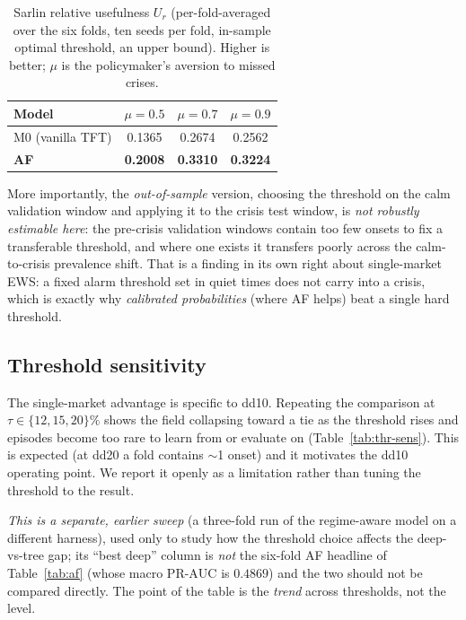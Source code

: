\documentclass[11pt,a4paper]{article}
\newcommand{\prauc}{\mbox{PR-AUC}}
\begin{document}
\begin{table}[h]
\centering\small
\caption{Sarlin relative usefulness $U_r$ (per-fold-averaged over the six
folds, ten seeds per fold, in-sample optimal threshold, an upper bound).
Higher is better; $\mu$ is the policymaker's aversion to missed crises.}
\label{tab:useful}
\begin{tabular}{lccc}
\toprule
Model & $\mu=0.5$ & $\mu=0.7$ & $\mu=0.9$ \\
\midrule
M0 (vanilla TFT)  & 0.1365 & 0.2674 & 0.2562 \\
\textbf{AF}       & \textbf{0.2008} & \textbf{0.3310} & \textbf{0.3224} \\
\bottomrule
\end{tabular}
\end{table}

More importantly, the \emph{out-of-sample} version, choosing the
threshold on the calm validation window and applying it to the crisis test
window, is \emph{not robustly estimable here}: the pre-crisis validation
windows contain too few onsets to fix a transferable threshold, and where one
exists it transfers poorly across the calm-to-crisis prevalence shift. That is a
finding in its own right about single-market EWS: a fixed alarm threshold set in
quiet times does not carry into a crisis, which is exactly why
\emph{calibrated probabilities} (where AF helps) beat a single hard threshold.

\subsection{Threshold sensitivity}
\label{sec:res-threshold}
The single-market advantage is specific to dd10. Repeating the comparison at
$\tau\in\{12,15,20\}\%$ shows the field collapsing toward a tie as the
threshold rises and episodes become too rare to learn from or evaluate on
(Table~\ref{tab:thr-sens}). This is expected (at dd20 a fold contains
$\sim$1 onset) and it motivates the dd10 operating point. We report it openly
as a limitation rather than tuning the threshold to the result.

\emph{This is a separate, earlier sweep} (a three-fold run of the
regime-aware model on a different harness), used only to study how the
threshold choice affects the deep-vs-tree gap; its ``best deep'' column is
\emph{not} the six-fold AF headline of Table~\ref{tab:af} (whose macro
$\prauc$ is $0.4869$) and the two should not be compared directly. The point of
the table is the \emph{trend} across thresholds, not the level.
\end{document}
